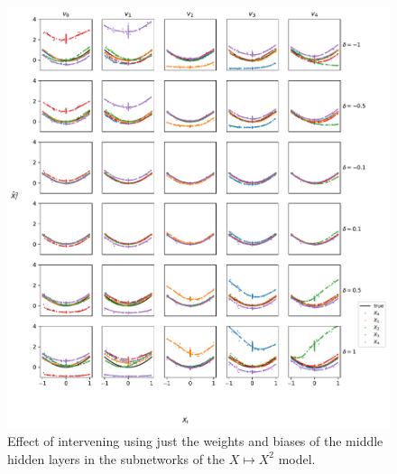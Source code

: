 \documentclass{article}
\theoremstyle{plain}
\theoremstyle{definition}
\theoremstyle{remark}
\begin{document}
\begin{figure}[ht]
    \centerline{\includegraphics[width=\textwidth]{../figures/s8_squared_intervention_middle_weights.pdf}}
    \centering
    \caption{Effect of intervening using just the weights and biases of the middle hidden layers in the subnetworks of the $X \mapsto X^2$ model.}\label{fig:s8_squared_intervention_middle_weights}
\end{figure}
\end{document}
